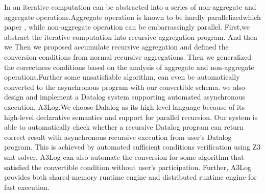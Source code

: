 In an iterative computation can be abstracted into a series of non-aggregate and aggregate operations.Aggregate operation is known to be hardly parallelized{\color{red}which paper} \cite{distribute aggregate from ms}, while non-aggregate operation can be embarrassingly parallel.
First,we abstract the iterative computation into recursive aggregation program. And then we  Then we proposed accumulate recursive aggregation and defined the conversion conditions from normal recursive aggregations. Then we generalized the correctness conditions based on the analysis of aggregate and non-aggregate operations.Further some unsatisfiable algorithm, can even be automatically converted to the asynchronous program with our convertible schema.
we also design and implement a Datalog system supporting automated asynchronous execution, A3Log.We choose Dalalog as its high level language because of its high-level declarative semantics and support for parallel recursion{\color{which paper}}\cite{}. Our system is able to automatically check whether a recursive Datalog program can return correct result with asynchronous recursive execution from user's Datalog program. This is achieved by automated sufficient conditions verification using Z3 smt solver. 
 A3Log can also automate the conversion for some algorithm that satisfied the convertible condition without user's participation. Further, A3Log provides both shared-memory runtime engine and distributed runtime engine for fast execution.


